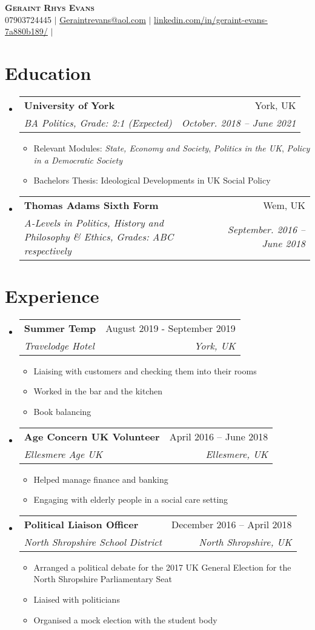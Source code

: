 \documentclass[letterpaper,11pt]{article}
\makeatletter
\newcommand{\resumeItem}[1]{
  \item\small{
    {#1 \vspace{-2pt}}
  }
}
\newcommand{\resumeSubheading}[4]{
  \vspace{-2pt}\item
    \begin{tabular*}{0.97\textwidth}[t]{l@{\extracolsep{\fill}}r}
      \textbf{#1} & #2 \\
      \textit{\small#3} & \textit{\small #4} \\
    \end{tabular*}\vspace{-7pt}
}
\newcommand{\resumeSubHeadingListStart}{\begin{itemize}[leftmargin=0.15in, label={}]}
\newcommand{\resumeSubHeadingListEnd}{\end{itemize}}
\newcommand{\resumeItemListStart}{\begin{itemize}}
\newcommand{\resumeItemListEnd}{\end{itemize}\vspace{-5pt}}
\makeatother
\begin{document}
\begin{center}
    \textbf{\Huge \scshape Geraint Rhys Evans} \\ \vspace{5pt}
    \small 07903724445 $|$ \href{mailto:x@x.com}{\underline{Geraintrevans@aol.com}} $|$ 
    \href{https://www.linkedin.com/in/geraint-evans-7a880b189/}{\underline{linkedin.com/in/geraint-evans-7a880b189/}} $|$
\end{center}


\section{Education}
  \resumeSubHeadingListStart
    \resumeSubheading
      {University of York}{York, UK}
      {BA Politics, Grade: 2:1 (Expected)}{October. 2018 -- June 2021}
        \resumeItemListStart
        \resumeItem{Relevant Modules: \textit{State, Economy and Society}, \textit{Politics in the UK}, \textit{Policy in a Democratic Society} }
        \resumeItem{Bachelors Thesis: Ideological Developments in UK Social Policy}
        \resumeItemListEnd
    \resumeSubheading
      {Thomas Adams Sixth Form}{Wem, UK}
      {A-Levels in Politics, History and Philosophy \& Ethics, Grades: ABC respectively}{September. 2016 -- June 2018}
  \resumeSubHeadingListEnd


\section{Experience}
  \resumeSubHeadingListStart

    \resumeSubheading
    {Summer Temp}{August 2019 - September 2019}
      {Travelodge Hotel}{York, UK}
      \resumeItemListStart
        \resumeItem{Liaising with customers and checking them into their rooms}
        \resumeItem{Worked in the bar and the kitchen}
        \resumeItem{Book balancing}  
    \resumeItemListEnd


    \resumeSubheading
    {Age Concern UK Volunteer}{April 2016 -- June 2018}
     {Ellesmere Age UK}{Ellesmere, UK}
     \resumeItemListStart   
        \resumeItem{Helped manage finance and banking}
        \resumeItem{Engaging with elderly people in a social care setting}
     \resumeItemListEnd

    \resumeSubheading
    {Political Liaison Officer}{December 2016 -- April 2018}
    {North Shropshire School District}{North Shropshire, UK}
    \resumeItemListStart
        \resumeItem{Arranged a political debate for the 2017 UK General Election for the North Shropshire Parliamentary Seat}
        \resumeItem{Liaised with politicians}
        \resumeItem{Organised a mock election with the student body}
    \resumeItemListEnd
 \resumeSubHeadingListEnd
\end{document}

